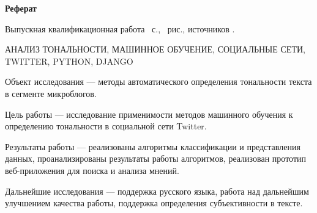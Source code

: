 \begin{center}
	\textbf{Реферат}
\end{center}

Выпускная квалификационная работа ~с., ~рис., источников .

АНАЛИЗ ТОНАЛЬНОСТИ, МАШИННОЕ ОБУЧЕНИЕ, СОЦИАЛЬНЫЕ СЕТИ, TWITTER, PYTHON, DJANGO

Объект исследования --- методы автоматического определения тональности текста в сегменте микроблогов.

Цель работы --- исследование применимости методов машинного обучения к определению тональности в социальной сети Twitter.

Результаты работы --- реализованы алгоритмы классификации и представления данных, проанализированы результаты работы алгоритмов, реализован прототип веб-приложения для поиска и анализа мнений.

Дальнейшие исследования --- поддержка русского языка, работа над дальнейшим улучшением качества работы, поддержка определения субъективности в тексте.